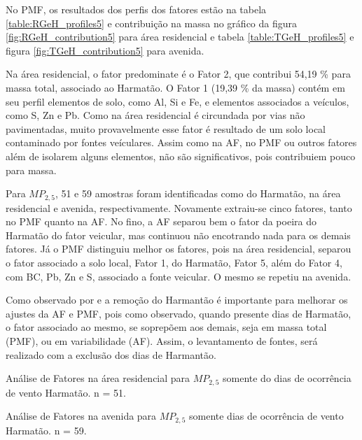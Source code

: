 No PMF, os resultados dos perfis dos fatores estão na tabela 
\ref{table:RGeH_profiles5} e contribuição na massa no gráfico da figura
\ref{fig:RGeH_contribution5} para área residencial e tabela 
\ref{table:TGeH_profiles5} e figura \ref{fig:TGeH_contribution5} para 
avenida. 

Na área residencial, o fator predominate é o Fator 2, que contribui
54,19 \% para massa total, associado ao Harmatão. O Fator 1 (19,39 \% da massa)
contém em seu perfil elementos de solo, como Al, Si e Fe, e elementos associados
a veículos, como S, Zn e Pb. Como na área residencial é circundada por vias 
não pavimentadas, muito provavelmente esse fator é resultado de um solo local
contaminado por fontes veículares. Assim como na AF, no PMF ou outros fatores 
além de isolarem alguns elementos, não são significativos, pois contribuiem 
pouco para massa. 

Para $MP_{2,5}$, 51 e 59 amostras foram identificadas como do Harmatão, 
na área residencial e avenida, respectivamente. Novamente extraiu-se cinco
fatores, tanto no PMF quanto na AF. No fino, a AF separou bem o fator da 
poeira do Harmatão do fator veicular, mas continuou não encotrando nada para 
os demais fatores. Já o PMF distinguiu melhor os fatores, pois na área 
residencial, separou o fator associado a solo local, Fator 1, do Harmatão, 
Fator 5, além do Fator 4, com BC, Pb, Zn e S, associado a fonte veicular. 
O mesmo se repetiu na avenida.    

Como observado por \citet{aboh2009} e \citet{ofosu2013} a remoção do Harmantão
é importante para melhorar os ajustes da AF e PMF, pois como observado, 
quando presente dias de Harmatão, o fator associado ao mesmo, se soprepõem 
aos demais, seja em massa total (PMF), ou em variabilidade (AF). Assim, 
o levantamento de fontes, será realizado com a exclusão dos dias de Harmantão.     

\newpage
\begin{table}[H]
  \centering
  
  \caption{Análise de Fatores na área residencial para $MP_{2,5}$
           somente do dias de ocorrência de vento Harmatão. n = 51.
          \label{table:AF_RFeH5}}
\end{table}

\begin{table}[H]
  \centering
  
  \caption{Análise de Fatores na avenida para $MP_{2,5}$
           somente dias de ocorrência de vento Harmatão. n = 59.
          \label{table:AF_TFeH5}}
\end{table}

